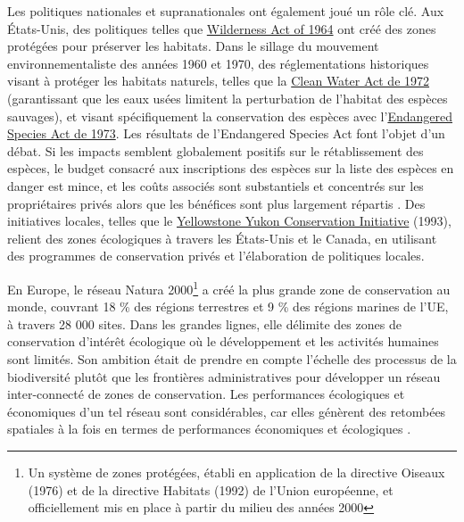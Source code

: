 Les politiques nationales et supranationales ont également joué un rôle clé.  Aux États-Unis, des politiques telles que \href{https://www.fs.usda.gov/Internet/FSE_DOCUMENTS/fseprd645666.pdf}{Wilderness Act of 1964} ont créé des zones protégées pour préserver les habitats. Dans le sillage du mouvement environnementaliste des années 1960 et 1970, des réglementations historiques visant à protéger les habitats naturels, telles que la \href{https://www.epa.gov/laws-regulations/summary-clean-water-act}{Clean Water Act de 1972} (garantissant que les eaux usées limitent la perturbation de l'habitat des espèces sauvages), et visant spécifiquement la conservation des espèces avec l'\href{https://www.fws.gov/sites/default/files/documents/endangered-species-act-accessible.pdf}{Endangered Species Act de 1973}. Les résultats de l'Endangered Species Act font l'objet d'un débat. Si les impacts semblent globalement positifs sur le rétablissement des espèces, le budget consacré aux inscriptions des espèces sur la liste des espèces en danger est mince, et les coûts associés sont substantiels et concentrés sur les propriétaires privés alors que les bénéfices sont plus largement répartis \citep{brown_economics_1998, langpap_economics_2018}. Des initiatives locales, telles que le \href{https://y2y.net/}{Yellowstone Yukon Conservation Initiative} (1993), relient des zones écologiques à travers les États-Unis et le Canada, en utilisant des programmes de conservation privés et l'élaboration de politiques locales. 

En Europe, le réseau Natura 2000\footnote{Un système de zones protégées, établi en application de la directive Oiseaux (1976) et de la directive Habitats (1992) de l'Union européenne, et officiellement mis en place à partir du milieu des années 2000} a créé la plus grande zone de conservation au monde, couvrant 18 \% des régions terrestres et 9 \% des régions marines de l'UE, à travers 28 000 sites. Dans les grandes lignes, elle délimite des zones de conservation d'intérêt écologique où le développement et les activités humaines sont limités. Son ambition était de prendre en compte l'échelle des processus de la biodiversité plutôt que les frontières administratives pour développer un réseau inter-connecté de zones de conservation. Les performances écologiques et économiques d'un tel réseau sont considérables, car elles génèrent des retombées spatiales à la fois en termes de performances économiques et écologiques \citep{cocco_relaxing_2023}.

